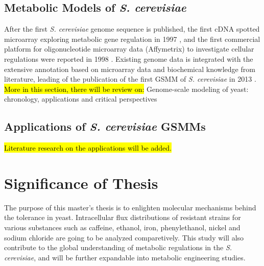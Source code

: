 \subsection{Metabolic Models of \emph{S. cerevisiae}}
After the first \emph{S. cerevisiae} genome sequence is published, the first cDNA spotted microarray exploring metabolic gene regulation in 1997 \cite{derisi1997exploring}, and the first commercial platform for oligonucleotide microarray data (Affymetrix) to investigate cellular regulations were reported in 1998 \cite{cho1998parallel}. Existing genome data is integrated with the extensive annotation based on microarray data and biochemical knowledge from literature, leading of the publication of the first GSMM of \emph{S. cerevisiae} in 2013 \cite{forster2003genome}.   \hl{More in this section, there will be review on:} Genome-scale modeling of yeast: chronology, applications and critical perspectives \cite{lopes2017genome}

\subsection{Applications of \emph{S. cerevisiae} GSMMs}
 \hl{Literature research on the applications will be added.}

\section{Significance of Thesis}
The purpose of this master's thesis is to enlighten molecular mechanisms behind the tolerance in yeast. Intracellular flux distributions of resistant strains for various substances such as caffeine, ethanol, iron, phenylethanol, nickel and sodium chloride are going to be analyzed comparetively. This study will also contribute to the global understanding of metabolic regulations in the \emph{S. cerevisiae}, and will be further expandable into metabolic engineering studies.
